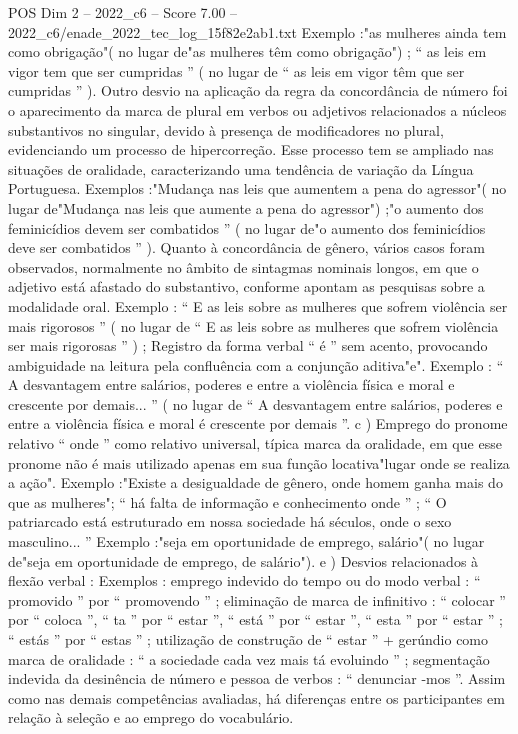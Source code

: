 \begin{textsample}{POS Dim 2 – 2022\_c6 – Score 7.00 – 2022\_c6/enade\_2022\_tec\_log\_15f82e2ab1.txt}
Exemplo :"as mulheres ainda tem como obrigação"( no lugar de"as mulheres têm como obrigação") ; “ as leis em vigor tem que ser cumpridas ” ( no lugar de “ as leis em vigor têm que ser cumpridas ” ).
Outro desvio na aplicação da regra da concordância de número foi o aparecimento da marca de plural em verbos ou adjetivos relacionados a núcleos substantivos no singular, devido à presença de modificadores no plural, evidenciando um processo de hipercorreção.
Esse processo tem se ampliado nas situações de oralidade, caracterizando uma tendência de variação da Língua Portuguesa.
Exemplos :"Mudança nas leis que aumentem a pena do agressor"( no lugar de"Mudança nas leis que aumente a pena do agressor") ;"o aumento dos feminicídios devem ser combatidos ” ( no lugar de"o aumento dos feminicídios deve ser combatidos ” ).
Quanto à concordância de gênero, vários casos foram observados, normalmente no âmbito de sintagmas nominais longos, em que o adjetivo está afastado do substantivo, conforme apontam as pesquisas sobre a modalidade oral.
Exemplo : “ E as leis sobre as mulheres que sofrem violência ser mais rigorosos ” ( no lugar de “ E as leis sobre as mulheres que sofrem violência ser mais rigorosas ” ) ; Registro da forma verbal “ é ” sem acento, provocando ambiguidade na leitura pela confluência com a conjunção aditiva"e".
Exemplo : “ A desvantagem entre salários, poderes e entre a violência física e moral e crescente por demais... ” ( no lugar de “ A desvantagem entre salários, poderes e entre a violência física e moral é crescente por demais ”. c ) Emprego do pronome relativo “ onde ” como relativo universal, típica marca da oralidade, em que esse pronome não é mais utilizado apenas em sua função locativa"lugar onde se realiza a ação".
Exemplo :"Existe a desigualdade de gênero, onde homem ganha mais do que as mulheres"; “ há falta de informação e conhecimento onde ” ; “ O patriarcado está estruturado em nossa sociedade há séculos, onde o sexo masculino... ” Exemplo :"seja em oportunidade de emprego, salário"( no lugar de"seja em oportunidade de emprego, de salário"). e ) Desvios relacionados à flexão verbal : Exemplos : emprego indevido do tempo ou do modo verbal : “ promovido ” por “ promovendo ” ; eliminação de marca de infinitivo : “ colocar ” por “ coloca ”, “ ta ” por “ estar ”, “ está ” por “ estar ”, “ esta ” por “ estar ” ; “ estás ” por “ estas ” ; utilização de construção de “ estar ” + gerúndio como marca de oralidade : “ a sociedade cada vez mais tá evoluindo ” ; segmentação indevida da desinência de número e pessoa de verbos : “ denunciar -mos ”.
Assim como nas demais competências avaliadas, há diferenças entre os participantes em relação à seleção e ao emprego do vocabulário.

\end{textsample}
